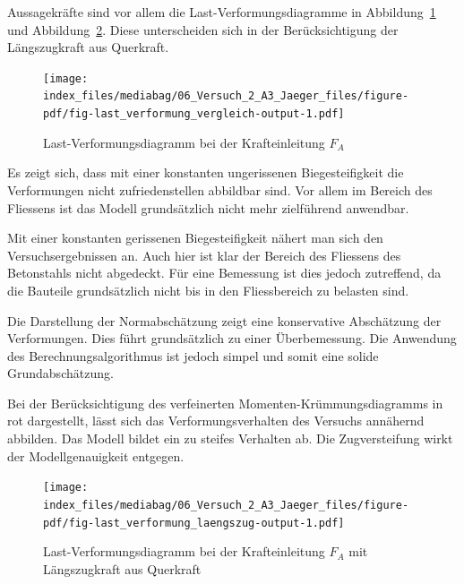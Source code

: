 \documentclass[
  letterpaper,
]{scrreprt}
\begin{document}
Aussagekräfte sind vor allem die Last-Verformungsdiagramme in
Abbildung~\ref{fig-last_verformung_vergleich} und
Abbildung~\ref{fig-last_verformung_laengszug}. Diese unterscheiden sich
in der Berücksichtigung der Längszugkraft aus Querkraft.

\begin{figure}[H]

{\centering \texttt{[image: index\_files/mediabag/06\_Versuch\_2\_A3\_Jaeger\_files/figure-pdf/fig-last\_verformung\_vergleich-output-1.pdf]}

}

\caption{\label{fig-last_verformung_vergleich}Last-Verformungsdiagramm
bei der Krafteinleitung \(F_A\)}

\end{figure}

Es zeigt sich, dass mit einer konstanten ungerissenen Biegesteifigkeit
die Verformungen nicht zufriedenstellen abbildbar sind. Vor allem im
Bereich des Fliessens ist das Modell grundsätzlich nicht mehr
zielführend anwendbar.

Mit einer konstanten gerissenen Biegesteifigkeit nähert man sich den
Versuchsergebnissen an. Auch hier ist klar der Bereich des Fliessens des
Betonstahls nicht abgedeckt. Für eine Bemessung ist dies jedoch
zutreffend, da die Bauteile grundsätzlich nicht bis in den Fliessbereich
zu belasten sind.

Die Darstellung der Normabschätzung zeigt eine konservative Abschätzung
der Verformungen. Dies führt grundsätzlich zu einer Überbemessung. Die
Anwendung des Berechnungsalgorithmus ist jedoch simpel und somit eine
solide Grundabschätzung.

Bei der Berücksichtigung des verfeinerten Momenten-Krümmungsdiagramms in
rot dargestellt, lässt sich das Verformungsverhalten des Versuchs
annähernd abbilden. Das Modell bildet ein zu steifes Verhalten ab. Die
Zugversteifung wirkt der Modellgenauigkeit entgegen.

\begin{figure}[H]

{\centering \texttt{[image: index\_files/mediabag/06\_Versuch\_2\_A3\_Jaeger\_files/figure-pdf/fig-last\_verformung\_laengszug-output-1.pdf]}

}

\caption{\label{fig-last_verformung_laengszug}Last-Verformungsdiagramm
bei der Krafteinleitung \(F_A\) mit Längszugkraft aus Querkraft}

\end{figure}
\end{document}

